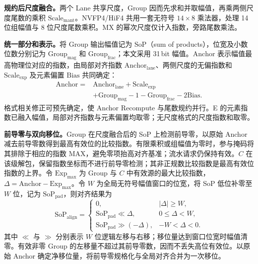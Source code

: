 \textbf{规约后尺度融合。}两个 Lane 共享尺度，Group 因而先求和并取幅值，再乘两侧尺度尾数的乘积 $\mathrm{Scale}_{\mathrm{mant}}$。NVFP4/HiF4 共用一套无符号 $14\times8$ 乘法器，处理 14 位组幅值与 8 位尺度尾数乘积。MX 的幂次尺度仅计入指数，旁路尾数乘法。

\textbf{统一部分和表示。}将 Group 输出幅值记为 $\mathrm{SoP}$（sum of products），位宽及小数位数分别记为 $\mathrm{Group}_{\mathrm{mag}}$ 和 $\mathrm{Group}_{\mathrm{frac}}$；本文采用 31\,bit 幅值。$\mathrm{Anchor}$ 表示幅值最高物理位对应的指数，由局部对齐指数 $\mathrm{Anchor}_{\mathrm{lane}}$、两侧尺度的无偏指数和 $\mathrm{Scale}_{\mathrm{exp}}$ 及元素偏置 $\mathrm{Bias}$ 共同确定：
\begin{equation}
\begin{aligned}
\mathrm{Anchor}={}&\mathrm{Anchor}_{\mathrm{lane}}+\mathrm{Scale}_{\mathrm{exp}}\\
 &+\mathrm{Group}_{\mathrm{mag}}-1-\mathrm{Group}_{\mathrm{frac}}-2\mathrm{Bias}.
\end{aligned}
\label{eq:anchor_recompute}
\end{equation}
格式相关修正可预先确定，使 Anchor Recompute 与尾数规约并行。E 的元素指数已融入幅值，局部对齐指数与元素偏置均取零；无尺度格式的尺度指数和取零。

\textbf{前导零与双向移位。}Group 在尺度融合后的 SoP 上检测前导零，以原始 Anchor 减去前导零数得到最高有效位的比较指数。有限乘积或组幅值为零时，参与掩码将其排除于相应的指数 MAX，避免零项抬高对齐基准；流水请求仍保持有效。$C$ 在该级解包，保留指数坐标而不进行前导零检测；其非正规数比较指数是最高有效位指数的上界。令 $\mathrm{Exp}_{\mathrm{max}}$ 为 Group 与 $C$ 中有效源的最大比较指数，$\Delta=\mathrm{Anchor}-\mathrm{Exp}_{\mathrm{max}}$。令 $W$ 为全局无符号幅值窗口的位宽，将 SoP 低位补零至 $W$ 位，记为 $\mathrm{SoP}_{\mathrm{pad}}$，则对齐结果为
\begin{equation}
\mathrm{SoP}_{\mathrm{align}}=
\begin{cases}
0, & |\Delta|\ge W,\\
\mathrm{SoP}_{\mathrm{pad}}\ll\Delta, & 0\le\Delta<W,\\
\mathrm{SoP}_{\mathrm{pad}}\gg(-\Delta), & -W<\Delta<0.
\end{cases}
\label{eq:bidirectional_alignment}
\end{equation}
其中 $\ll$ 与 $\gg$ 分别表示 $W$ 位逻辑左移与右移；移位量达到窗口位宽时幅值清零。有效非零 Group 的左移量不超过其前导零数，因而不丢失高位有效位。以原始 Anchor 确定净移位量，将前导零规格化与全局对齐合并为一次移位。

